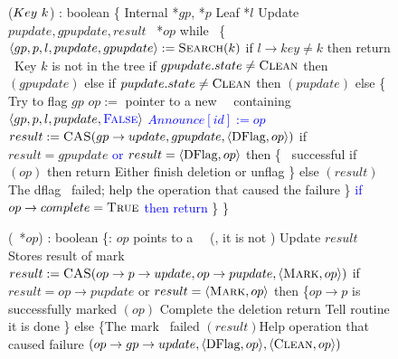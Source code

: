 \begin{figure*}
	\scriptsize
	\begin{code}
		\firstline
		($Key\ k$) : boolean \{\nlc
		\n Internal *$gp$, *$p$\nlc
		Leaf *$l$\nlc
		Update $pupdate, gpupdate, result$\nlc
		\DFlag\ *$op$\bl\nlc
		while \TRUE\ \{ \nlc
		\n     $\langle gp, p, l, pupdate, gpupdate \rangle := \mbox{\sc Search}(k)$\label{del-search}\nlc
		if $l\rightarrow key \neq k$ then return \FALSE\ \tabtabcom Key $k$ is not in the tree\label{delete-false}\nlc
		if $gpupdate.state \neq \mbox{\sc Clean}$ then $(gpupdate)$ \label{del-help-unclean-1}\nlc
		else if $pupdate.state \neq \mbox{\sc Clean}$ then $(pupdate)$\label{del-help-unclean-2}\nlc
		else \{ \tabtabcom Try to flag $gp$\nlc
		\n          $op :=$ pointer to a new \DFlag\ \record\  containing $\langle gp, p, l, pupdate, \textcolor{blue}{\mbox{\sc False}} \rangle$\label{new-DFlag}\nlc
		\textcolor{blue}{$Announce[id] := op$} \nlc
		$result := \mbox{\sc CAS}(gp\rightarrow update, gpupdate, \langle \mbox{DFlag}, op \rangle)$ \label{dflag-cas}\nlc
		if $result = gpupdate$ \textcolor{blue}{ or $result = \langle \mbox{DFlag}, op \rangle$} then \{ \tabtabcom \CASB\ successful \nlc
		\n             if $(op)$ then return \TRUE \label{delete-true} \tabtabcom Either finish deletion or unflag\nlc
		\p          \}\nlc                 
		else $(result)$ \tabcom The dflag \CASB\ failed; help the operation that caused the failure \label{del-help-after-failure}\nlc%
		\p     \}\nlc
		\textcolor{blue}{if $op \rightarrow complete = \mbox{\sc True}$ then} \nlc
		\n		\textcolor{blue}{return \TRUE} \nlc \p
		\p \}\nlc
		\p
		\}\bl
		\nlc
		
		(\DFlag\ *$op$) : boolean \{\ul
		\n   {}:  $op$ points to a \DFlag\ \record\  (\ie, it is not \NULL)\nlc%
		Update $result$ \tabtabcom Stores result of mark \CASB\bl\nlc
		$result := \mbox{\sc CAS}(op\rightarrow p\rightarrow update, op\rightarrow pupdate, \langle \mbox{\sc Mark}, op\rangle)$ \label{mark-cas}\nlc     
		if $result = op\rightarrow pupdate$ or $result = \langle \mbox{\sc Mark}, op\rangle$ then \label{checkmark}\{\tabtabcom $op\rightarrow p$ is successfully marked\nlc
		\n          {}$(op)$ \label{call-hm1} \tabtabcom Complete the deletion\nlc
		return \TRUE\tabtabcom Tell  routine it is done\nlc
		\p       \}\nlc
		else \{\tabtabcom The mark \CASB\ failed \nlc
		\n              
		$(result)$\label{help-after-failed-mark}\tabtabcom Help operation that caused failure\nlc
		\CASB$(op\rightarrow gp\rightarrow update, \langle \mbox{DFlag}, op\rangle, \langle \mbox{\sc Clean}, op\rangle)$ \label{backtrack-cas}\nlc
		

\end{code}
\end{figure*}
